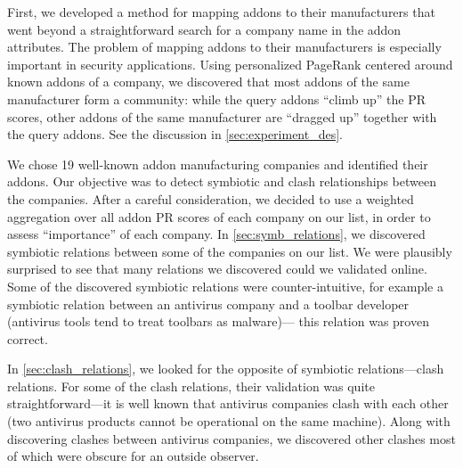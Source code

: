 \documentclass[ijoc,nonblindrev]{informs3} %
\numberwithin{equation}{subsection}
\begin{document}
First, we developed a method for mapping addons to their manufacturers that went beyond a straightforward search for a company name in the addon attributes. The problem of mapping addons to their manufacturers is especially important in security applications. Using personalized PageRank centered around known addons of a company, we discovered that most addons of the same manufacturer form a community: while the query addons ``climb up'' the PR scores, other addons of the same manufacturer are ``dragged up'' together with the query addons. See the discussion in \autoref{sec:experiment_des}.

We chose 19 well-known addon manufacturing companies and identified their addons. Our objective was to detect symbiotic and clash relationships between the companies. 
After a careful consideration, we decided to use a weighted aggregation over all addon PR scores of each company on our list, in order to assess ``importance'' of each company.
In \autoref{sec:symb_relations}, we discovered symbiotic relations between some of the companies on our list. We were plausibly surprised to see that many relations we discovered could we validated online. Some of the discovered symbiotic relations were counter-intuitive, for example a symbiotic relation between an antivirus company and a toolbar developer (antivirus tools tend to treat toolbars as malware)--- this relation was proven correct.

In \autoref{sec:clash_relations}, we looked for the opposite of symbiotic relations---clash relations. For some of the clash relations, their validation was quite straightforward---it is well known that antivirus companies clash with each other (two antivirus products cannot be operational on the same machine). Along with discovering clashes between antivirus companies, we discovered other clashes most of which were obscure for an outside observer.


\end{document}
